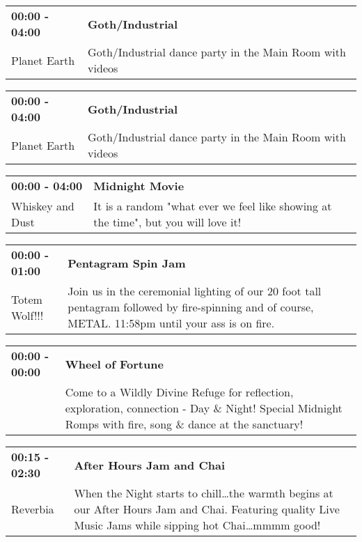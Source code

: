 \begin{tabular}{ p{1in} p{2.2in} }
    \textbf{00:00 - 04:00} & \textbf{Goth/Industrial} \\
    Planet Earth \newline  & Goth/Industrial dance party in the Main Room with videos \\
    \hline 
\end{tabular}
    
\begin{tabular}{ p{1in} p{2.2in} }
    \textbf{00:00 - 04:00} & \textbf{Goth/Industrial} \\
    Planet Earth \newline  & Goth/Industrial dance party in the Main Room with videos \\
    \hline 
\end{tabular}
    
\begin{tabular}{ p{1in} p{2.2in} }
    \textbf{00:00 - 04:00} & \textbf{Midnight Movie} \\
    Whiskey and Dust \newline  & It is a random "what ever we feel like showing at the time", but you will love it! \\
    \hline 
\end{tabular}
    
\begin{tabular}{ p{1in} p{2.2in} }
    \textbf{00:00 - 01:00} & \textbf{Pentagram Spin Jam} \\
    Totem Wolf!!! \newline  & Join us in the ceremonial lighting of our 20 foot tall pentagram followed by fire-spinning and of course, METAL. 11:58pm until your ass is on fire. \\
    \hline 
\end{tabular}
    
\begin{tabular}{ p{1in} p{2.2in} }
    \textbf{00:00 - 00:00} & \textbf{Wheel of Fortune} \\
    ~ \newline  & Come to a Wildly Divine Refuge for reflection, exploration, connection - Day \& Night! Special Midnight Romps with fire, song \& dance at the sanctuary! \\
    \hline 
\end{tabular}
    
\begin{tabular}{ p{1in} p{2.2in} }
    \textbf{00:15 - 02:30} & \textbf{After Hours Jam and Chai} \\
    Reverbia \newline  & When the Night starts to chill\ldots the warmth begins at our After Hours Jam and Chai.  Featuring quality Live Music Jams while sipping hot Chai\ldots mmmm good! \\
    \hline 
\end{tabular}
    
